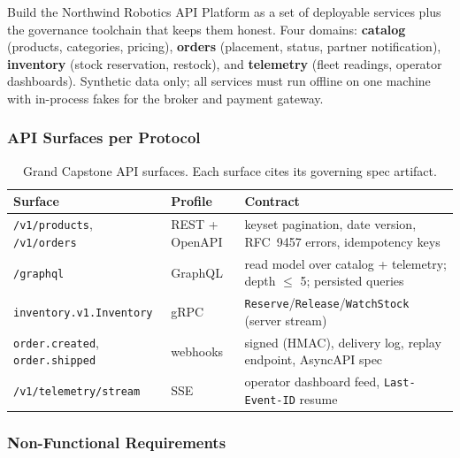 Build the Northwind Robotics API Platform as a set of deployable services
plus the governance toolchain that keeps them honest. Four domains:
\textbf{catalog} (products, categories, pricing), \textbf{orders} (placement,
status, partner notification), \textbf{inventory} (stock reservation,
restock), and \textbf{telemetry} (fleet readings, operator dashboards).
Synthetic data only; all services must run offline on one machine with
in-process fakes for the broker and payment gateway.

\subsubsection{API Surfaces per Protocol}

\begin{table}[htbp]
  \centering
  \small
  \begin{tabularx}{\textwidth}{l l X}
    \toprule
    \textbf{Surface} & \textbf{Profile} & \textbf{Contract} \\
    \midrule
    \texttt{/v1/products}, \texttt{/v1/orders} & REST + OpenAPI &
      keyset pagination, date version, RFC~9457 errors, idempotency keys \\
    \texttt{/graphql} & GraphQL &
      read model over catalog + telemetry; depth $\leq$ 5; persisted queries \\
    \texttt{inventory.v1.Inventory} & gRPC &
      \texttt{Reserve}/\texttt{Release}/\texttt{WatchStock} (server stream) \\
    \texttt{order.created}, \texttt{order.shipped} & webhooks &
      signed (HMAC), delivery log, replay endpoint, AsyncAPI spec \\
    \texttt{/v1/telemetry/stream} & SSE &
      operator dashboard feed, \texttt{Last-Event-ID} resume \\
    \bottomrule
  \end{tabularx}
  \caption{Grand Capstone API surfaces. Each surface cites its governing
  spec artifact.}
  \label{tab:capstone-surfaces}
\end{table}

\subsubsection{Non-Functional Requirements}

